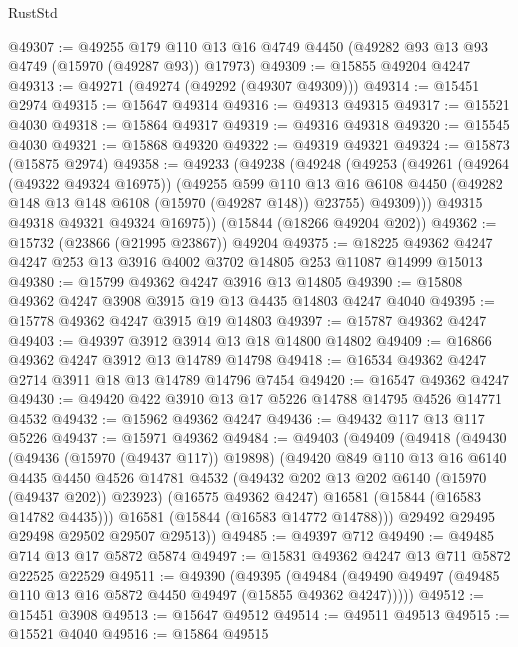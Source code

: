 \begin{lexlean}{RustStd}
\begin{coremodule}
@49307 := @49255
    @179
    @110
    @13
    @16
    @4749
    @4450
    (@49282 @93 @13 @93 @4749 (@15970 (@49287 @93)) @17973)
@49309 := @15855 @49204 @4247
@49313 := @49271 (@49274 (@49292 (@49307 @49309)))
@49314 := @15451 @2974
@49315 := @15647 @49314
@49316 := @49313 @49315
@49317 := @15521 @4030
@49318 := @15864 @49317
@49319 := @49316 @49318
@49320 := @15545 @4030
@49321 := @15868 @49320
@49322 := @49319 @49321
@49324 := @15873 (@15875 @2974)
@49358 := @49233
    (@49238
      (@49248
        (@49253
          (@49261
            (@49264 (@49322 @49324 @16975))
            (@49255
              @599
              @110
              @13
              @16
              @6108
              @4450
              (@49282 @148 @13 @148 @6108 (@15970 (@49287 @148)) @23755)
              @49309)))
        @49315
        @49318
        @49321
        @49324
        @16975))
    (@15844 (@18266 @49204 @202))
@49362 := @15732 (@23866 (@21995 @23867)) @49204
@49375 := @18225 @49362 @4247 @4247 @253 @13 @3916 @4002 @3702 @14805 @253 @11087 @14999 @15013
@49380 := @15799 @49362 @4247 @3916 @13 @14805
@49390 := @15808 @49362 @4247 @3908 @3915 @19 @13 @4435 @14803 @4247 @4040
@49395 := @15778 @49362 @4247 @3915 @19 @14803
@49397 := @15787 @49362 @4247
@49403 := @49397 @3912 @3914 @13 @18 @14800 @14802
@49409 := @16866 @49362 @4247 @3912 @13 @14789 @14798
@49418 := @16534 @49362 @4247 @2714 @3911 @18 @13 @14789 @14796 @7454
@49420 := @16547 @49362 @4247
@49430 := @49420 @422 @3910 @13 @17 @5226 @14788 @14795 @4526 @14771 @4532
@49432 := @15962 @49362 @4247
@49436 := @49432 @117 @13 @117 @5226
@49437 := @15971 @49362
@49484 := @49403
    (@49409
      (@49418
        (@49430
          (@49436 (@15970 (@49437 @117)) @19898)
          (@49420
            @849
            @110
            @13
            @16
            @6140
            @4435
            @4450
            @4526
            @14781
            @4532
            (@49432 @202 @13 @202 @6140 (@15970 (@49437 @202)) @23923)
            (@16575 @49362 @4247)
            @16581
            (@15844 (@16583 @14782 @4435)))
          @16581
          (@15844 (@16583 @14772 @14788)))
        @29492
        @29495
        @29498
        @29502
        @29507
        @29513))
@49485 := @49397 @712
@49490 := @49485 @714 @13 @17 @5872 @5874
@49497 := @15831 @49362 @4247 @13 @711 @5872 @22525 @22529
@49511 := @49390
    (@49395 (@49484 (@49490 @49497 (@49485 @110 @13 @16 @5872 @4450 @49497 (@15855 @49362 @4247)))))
@49512 := @15451 @3908
@49513 := @15647 @49512
@49514 := @49511 @49513
@49515 := @15521 @4040
@49516 := @15864 @49515

\end{coremodule}
\end{lexlean}
